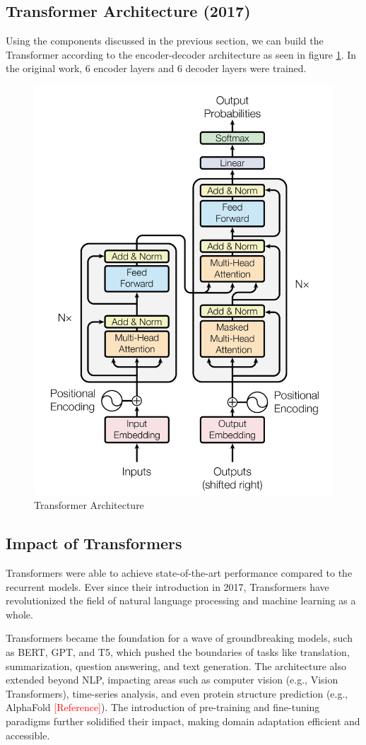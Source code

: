\documentclass[11pt,twoside]{article}
\begin{document}
\subsection{Transformer Architecture (2017)}

Using the components discussed in the previous section, we can build the Transformer according to the encoder-decoder architecture as seen in figure \ref{fig:transformer}. In the original work, 6 encoder layers and 6 decoder layers were trained.

\begin{figure}[T]
    \centering
    \includegraphics[width=0.65\linewidth]{fig/transfomer.png}
    \caption{Transformer Architecture}
    \label{fig:transformer}
\end{figure}

\subsection{Impact of Transformers}
Transformers were able to achieve state-of-the-art performance compared to the recurrent models. 
Ever since their introduction in 2017, Transformers have revolutionized the field of natural language processing and machine learning as a whole. 

Transformers became the foundation for a wave of groundbreaking models, such as BERT, GPT, and T5, which pushed the boundaries of tasks like translation, summarization, question answering, and text generation. The architecture also extended beyond NLP, impacting areas such as computer vision (e.g., Vision Transformers), time-series analysis, and even protein structure prediction (e.g., AlphaFold \textcolor{red}{[Reference]}). The introduction of pre-training and fine-tuning paradigms further solidified their impact, making domain adaptation efficient and accessible.
\end{document}
